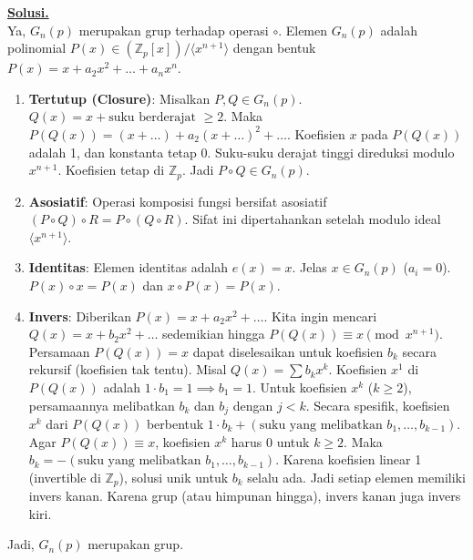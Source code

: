 \documentclass[12pt,twoside]{article}
\newenvironment{solution}
{
	\par\noindent\textbf{\underline{Solusi.}}\\
}
{
	\par
}
\begin{document}
\begin{enumerate}
        \begin{solution}
          Ya, $G_n(p)$ merupakan grup terhadap operasi $\circ$.
          Elemen $G_n(p)$ adalah polinomial $P(x) \in (\mathbb{Z}_p[x]) / \langle x^{n+1} \rangle$ dengan bentuk $P(x) = x + a_2 x^2 + \dots + a_n x^n$.
          \begin{enumerate}
            \item \textbf{Tertutup (Closure)}:
                  Misalkan $P, Q \in G_n(p)$.
                  $Q(x) = x + \text{suku berderajat } \ge 2$.
                  Maka $P(Q(x)) = (x + \dots) + a_2 (x+\dots)^2 + \dots$.
                  Koefisien $x$ pada $P(Q(x))$ adalah 1, dan konstanta tetap 0. Suku-suku derajat tinggi direduksi modulo $x^{n+1}$.
                  Koefisien tetap di $\mathbb{Z}_p$. Jadi $P \circ Q \in G_n(p)$.
            \item \textbf{Asosiatif}:
                  Operasi komposisi fungsi bersifat asosiatif $(P \circ Q) \circ R = P \circ (Q \circ R)$. Sifat ini dipertahankan setelah modulo ideal $\langle x^{n+1} \rangle$.
            \item \textbf{Identitas}:
                  Elemen identitas adalah $e(x) = x$. Jelas $x \in G_n(p)$ ($a_i=0$).
                  $P(x) \circ x = P(x)$ dan $x \circ P(x) = P(x)$.
            \item \textbf{Invers}:
                  Diberikan $P(x) = x + a_2 x^2 + \dots$. Kita ingin mencari $Q(x) = x + b_2 x^2 + \dots$ sedemikian hingga $P(Q(x)) \equiv x \pmod{x^{n+1}}$.
                  Persamaan $P(Q(x)) = x$ dapat diselesaikan untuk koefisien $b_k$ secara rekursif (koefisien tak tentu).
                  Misal $Q(x) = \sum b_k x^k$.
                  Koefisien $x^1$ di $P(Q(x))$ adalah $1 \cdot b_1 = 1 \implies b_1=1$.
                  Untuk koefisien $x^k$ ($k \ge 2$), persamaannya melibatkan $b_k$ dan $b_j$ dengan $j < k$.
                  Secara spesifik, koefisien $x^k$ dari $P(Q(x))$ berbentuk $1 \cdot b_k + (\text{suku yang melibatkan } b_1, \dots, b_{k-1})$.
                  Agar $P(Q(x)) \equiv x$, koefisien $x^k$ harus 0 untuk $k \ge 2$.
                  Maka $b_k = -(\text{suku yang melibatkan } b_1, \dots, b_{k-1})$.
                  Karena koefisien linear 1 (invertible di $\mathbb{Z}_p$), solusi unik untuk $b_k$ selalu ada.
                  Jadi setiap elemen memiliki invers kanan. Karena grup (atau himpunan hingga), invers kanan juga invers kiri.
          \end{enumerate}
          Jadi, $G_n(p)$ merupakan grup.
        \end{solution}
\end{enumerate}
\pagebreak
\end{document}
